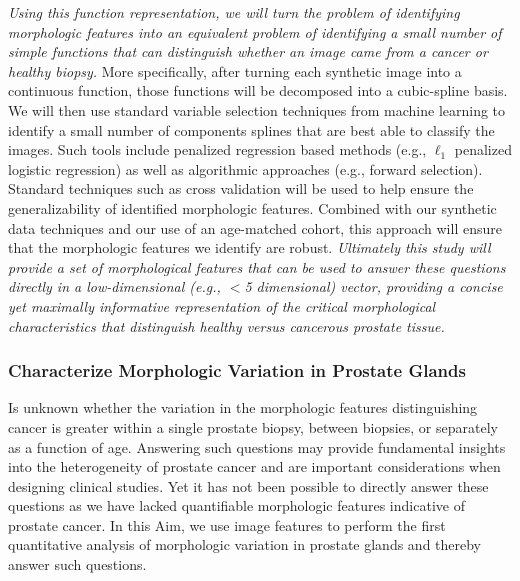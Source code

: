 \documentclass{NIHGrant}
\theoremstyle{theorem}
\begin{document}
\textit{Using this function representation, we will turn the problem of identifying morphologic features into an equivalent problem of identifying a small number of simple functions that can distinguish whether an image came from a cancer or healthy biopsy.} More specifically, after turning each synthetic image into a continuous function, those functions will be decomposed into a cubic-spline basis. We will then use standard variable selection techniques from machine learning to identify a small number of components splines that are best able to classify the images. Such tools include penalized regression based methods (e.g., \(\ell_{1}\) penalized logistic regression) as well as algorithmic approaches (e.g., forward selection). Standard techniques such as cross validation will be used to help ensure the generalizability of identified morphologic features. Combined with our synthetic data techniques and our use of an age-matched cohort, this approach will ensure that the morphologic features we identify are robust. \emph{Ultimately this study will provide a set of morphological features that can be used to answer these questions directly in a low-dimensional (e.g., $<$5 dimensional) vector, providing a concise yet maximally informative representation of the critical morphological characteristics that distinguish healthy versus cancerous prostate tissue.}

\subsubsection*{Characterize Morphologic Variation in Prostate Glands} \label{aim3.2}
Is unknown whether the variation in the morphologic features distinguishing cancer is greater within a single prostate biopsy, between biopsies, or separately as a function of age. Answering such questions may provide fundamental insights into the heterogeneity of prostate cancer and are important considerations when designing clinical studies. Yet it has not been possible to directly answer these questions as we have lacked quantifiable morphologic features indicative of prostate cancer. In this Aim, we use image features to perform the first quantitative analysis of morphologic variation in prostate glands and thereby answer such questions.
\end{document}
